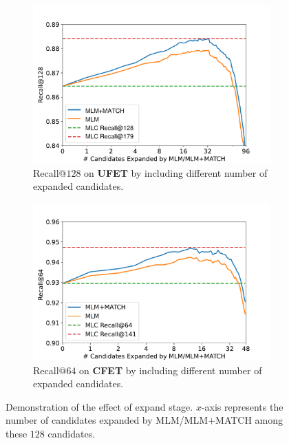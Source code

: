 \begin{figure}[t]
     \centering
     \begin{subfigure}[h]{0.45\textwidth}
         \centering
         \includegraphics[width=\textwidth]{src/img/recall_ufet.pdf}
         \caption{Recall@$128$ on {\bf \textsc{UFET}} by including different number of expanded candidates. }
         \label{fig:c1}
     \end{subfigure}
     \vfill
     \begin{subfigure}[h]{0.45\textwidth}
         \centering
         \includegraphics[width=\textwidth]{src/img/recall_cfet.pdf}
         \caption{Recall@$64$ on {\bf \textsc{CFET}} by including different number of expanded candidates.}
         \label{fig:c2}
     \end{subfigure}
\caption{Demonstration of the effect of expand stage. $x$-axis represents the number of candidates expanded by MLM/MLM+MATCH among these $128$ candidates. }
\label{fig:expand_improvement}
\end{figure}
\label{sec:exp_expand}

